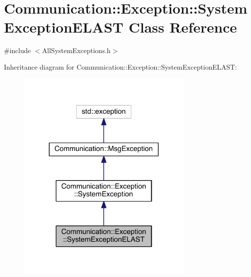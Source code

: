 \hypertarget{class_communication_1_1_exception_1_1_system_exception_e_l_a_s_t}{}\section{Communication\+:\+:Exception\+:\+:System\+Exception\+E\+L\+A\+S\+T Class Reference}
\label{class_communication_1_1_exception_1_1_system_exception_e_l_a_s_t}


{\ttfamily \#include $<$All\+System\+Exceptions.\+h$>$}



Inheritance diagram for Communication\+:\+:Exception\+:\+:System\+Exception\+E\+L\+A\+S\+T\+:\nopagebreak
\begin{figure}[H]
\begin{center}
\leavevmode
\includegraphics[width=248pt]{class_communication_1_1_exception_1_1_system_exception_e_l_a_s_t__inherit__graph}
\end{center}
\end{figure}


